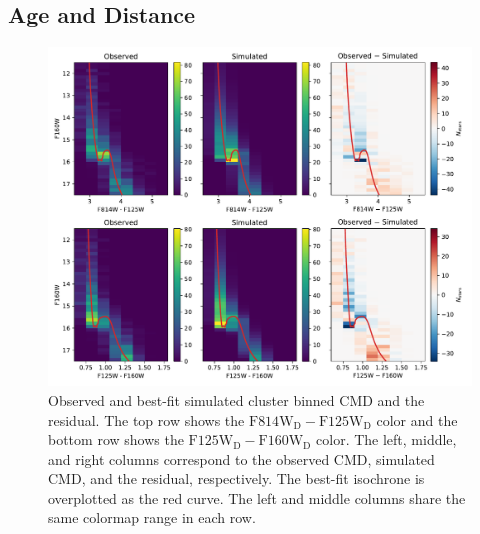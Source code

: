 \documentclass[12pt]{ucsddissertation}
\begin{document}
\begin{CJK*}{UTF8}{gbsn}
\subsection{Age and Distance}
\label{wd1-subsec:age_distance}

\begin{figure}[htb!]
    \centering
    \includegraphics[width=\linewidth]{figures/chapter2/CMD.pdf}
    \caption[Observed and best-fit simulated cluster binned CMD and the residual.]{Observed and best-fit simulated cluster binned CMD and the residual. The top row shows the $\mathrm{F814W_D} - \mathrm{F125W_D}$ color and the bottom row shows the $\mathrm{F125W_D} - \mathrm{F160W_D}$ color. The left, middle, and right columns correspond to the observed CMD, simulated CMD, and the residual, respectively. The best-fit isochrone is overplotted as the red curve. The left and middle columns share the same colormap range in each row.}
    \label{fig:cmd}
\end{figure}


\end{CJK*}
\end{document}

